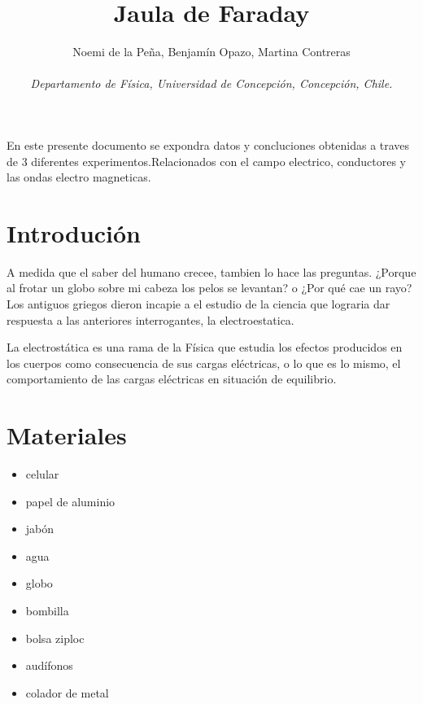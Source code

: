 \documentclass[a4paper,12pt]{article}
\title{Jaula de Faraday}
\author{Noemi de la Peña, Benjamín Opazo, Martina Contreras \\ \\
 \textit{ Departamento de Física, Universidad de Concepción, Concepción, Chile. }}
\date{}
\begin{document}
\maketitle 




En este presente documento se expondra datos y concluciones 
obtenidas a traves de 3 diferentes experimentos.Relacionados con el campo electrico,
conductores y las ondas electro magneticas.



\section*{Introdución}
    A medida que el saber del humano crecee, tambien lo hace las preguntas.
    ¿Porque al frotar un globo sobre mi cabeza los pelos se levantan? o 
    ¿Por qué cae un rayo?
    Los antiguos griegos dieron incapie a el estudio de la ciencia que 
    lograria dar respuesta a las anteriores interrogantes, la electroestatica.

    La electrostática es una rama de la Física que estudia los efectos producidos 
    en los cuerpos como consecuencia de sus cargas eléctricas, o lo que es lo mismo, 
    el comportamiento de las cargas eléctricas en situación de equilibrio.






   






\section*{Materiales}
\begin{multicols}{2}
\begin{itemize}
    \item celular
    \item papel de aluminio
    \item jabón
    \item agua
    \item globo
    \item bombilla
    \item bolsa ziploc
    \item audífonos
    \item colador de metal 
\end{itemize}
\end{multicols}
\end{document}
